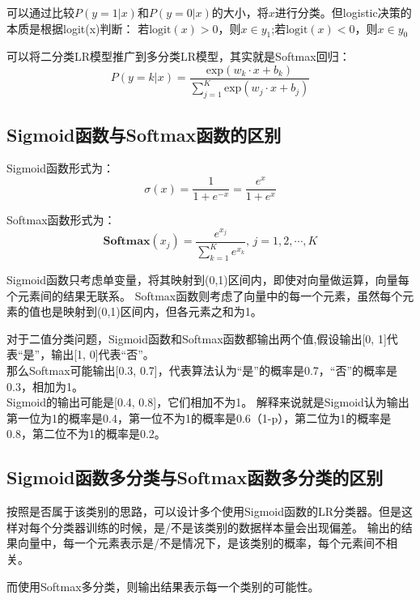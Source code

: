 可以通过比较$P(y=1|x)$和$P(y=0|x)$的大小，将$x$进行分类。但logistic决策的本质是根据logit(x)判断：
若$\text{logit}(x) > 0$，则$x\in y_1$;若$\text{logit}(x) < 0$，则$x\in y_0$

可以将二分类LR模型推广到多分类LR模型，其实就是Softmax回归：
\begin{equation*}
    P(y=k|x) = \frac{\text{exp}(w_k\cdot x + b_k)}{\sum_{j=1}^K \text{exp}(w_j \cdot x + b_j)}
\end{equation*}


\subsection{Sigmoid函数与Softmax函数的区别}
Sigmoid函数形式为：
\begin{equation*}
    \sigma(x) = \frac{1}{1 + e^{-x}} = \frac{e^{x}}{1 + e^{x}}
\end{equation*}

Softmax函数形式为：
\begin{equation*}
    \textbf{Softmax}(x_j) = \frac{e^{x_j}}{\sum_{k=1}^K e^{x_k}},\, j=1,2,\cdots,K
\end{equation*}

Sigmoid函数只考虑单变量，将其映射到(0,1)区间内，即使对向量做运算，向量每个元素间的结果无联系。
Softmax函数则考虑了向量中的每一个元素，虽然每个元素的值也是映射到(0,1)区间内，但各元素之和为1。

对于二值分类问题，Sigmoid函数和Softmax函数都输出两个值,假设输出[0, 1]代表“是”，输出[1, 0]代表“否”。\\
那么Softmax可能输出[0.3, 0.7]，代表算法认为“是”的概率是0.7，“否”的概率是0.3，相加为1。\\
Sigmoid的输出可能是[0.4, 0.8]，它们相加不为1。
解释来说就是Sigmoid认为输出第一位为1的概率是0.4，第一位不为1的概率是0.6（1-p），第二位为1的概率是0.8，第二位不为1的概率是0.2。

\subsection{Sigmoid函数多分类与Softmax函数多分类的区别}
按照是否属于该类别的思路，可以设计多个使用Sigmoid函数的LR分类器。但是这样对每个分类器训练的时候，是/不是该类别的数据样本量会出现偏差。
输出的结果向量中，每一个元素表示是/不是情况下，是该类别的概率，每个元素间不相关。

而使用Softmax多分类，则输出结果表示每一个类别的可能性。

